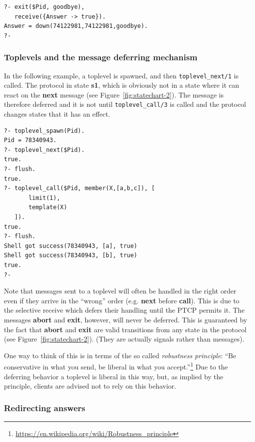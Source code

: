 \begin{verbatim}
?- exit($Pid, goodbye),
   receive({Answer -> true}).
Answer = down(74122981,74122981,goodbye).
?-
\end{verbatim}

\subsubsection{Toplevels and the message deferring mechanism}\label{sec:deferring}

In the following example, a toplevel is spawned, and then \texttt{toplevel\_next/1} is called. The protocol in state \textbf{s1}, which is obviously not in a state where it can react on the \textbf{next} message (see Figure~\ref{fig:statechart-2}). The message is therefore deferred and it is not until \texttt{toplevel\_call/3} is called and the protocol changes states that it has an effect.

\begin{verbatim}
?- toplevel_spawn(Pid).
Pid = 78340943.
?- toplevel_next($Pid).
true.
?- flush.
true.
?- toplevel_call($Pid, member(X,[a,b,c]), [
       limit(1),
       template(X)
   ]).
true.
?- flush.
Shell got success(78340943, [a], true)
Shell got success(78340943, [b], true)
true.
?- 
\end{verbatim}

\noindent Note that messages sent to a toplevel will often be handled in the right order even if they arrive in the ``wrong'' order (e.g. \textbf{next} before \textbf{call}). This is due to the selective receive which defers their handling until the PTCP permits it. The messages \textbf{abort} and \textbf{exit}, however, will never be deferred. This is guaranteed by the fact that \textbf{abort} and \textbf{exit} are valid transitions from any state in the protocol (see Figure~\ref{fig:statechart-2}). (They are actually signals rather than messages).

One way to think of this is in terms of the so called \textit{robustness principle}: ``Be conservative in what you send, be liberal in what you accept.''\footnote{\url{https://en.wikipedia.org/wiki/Robustness\_principle}} Due to the deferring behavior a toplevel is liberal in this way, but, as implied by the principle, clients are advised not to rely on this behavior.

\subsubsection{Redirecting answers}\label{sec:toplevel-redirect}


